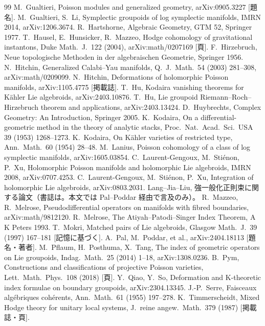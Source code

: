 \begin{thebibliography}{99}
 M.\ Gualtieri, Poisson modules and generalized geometry, arXiv:0905.3227 [題名\tQ].
 M.\ Gualtieri, S.\ Li, Symplectic groupoids of log symplectic manifolds, IMRN 2014, arXiv:1206.3674.
 R.\ Hartshorne, Algebraic Geometry, GTM 52, Springer 1977.
 T.\ Hausel, E.\ Hunsicker, R.\ Mazzeo, Hodge cohomology of gravitational instantons, Duke Math.\ J.\ 122 (2004), arXiv:math/0207169 [頁\tQ].
 F.\ Hirzebruch, Neue topologische Methoden in der algebraischen Geometrie, Springer 1956.
 N.\ Hitchin, Generalized Calabi--Yau manifolds, Q.\ J.\ Math.\ 54 (2003) 281--308, arXiv:math/0209099.
 N.\ Hitchin, Deformations of holomorphic Poisson manifolds, arXiv:1105.4775 [掲載誌\tQ].
 T.\ Hu, Kodaira vanishing theorems for K\"ahler Lie algebroids, arXiv:2403.10876.
 T.\ Hu, Lie groupoid Riemann--Roch--Hirzebruch theorem and applications, arXiv:2403.13424.
 D.\ Huybrechts, Complex Geometry: An Introduction, Springer 2005.
 K.\ Kodaira, On a differential-geometric method in the theory of analytic stacks, Proc.\ Nat.\ Acad.\ Sci.\ USA 39 (1953) 1268--1273.
 K.\ Kodaira, On K\"ahler varieties of restricted type, Ann.\ Math.\ 60 (1954) 28--48.
 M.\ Lanius, Poisson cohomology of a class of log symplectic manifolds, arXiv:1605.03854.
 C.\ Laurent-Gengoux, M.\ Sti\'enon, P.\ Xu, Holomorphic Poisson manifolds and holomorphic Lie algebroids, IMRN 2008, arXiv:0707.4253.
 C.\ Laurent-Gengoux, M.\ Sti\'enon, P.\ Xu, Integration of holomorphic Lie algebroids, arXiv:0803.2031.
 Lang--Jia--Liu, 強一般化正則束に関する論文（書誌は\tQ。本文では Pal--Poddar 経由で言及のみ）。
 R.\ Mazzeo, R.\ Melrose, Pseudodifferential operators on manifolds with fibred boundaries, arXiv:math/9812120.
 R.\ Melrose, The Atiyah--Patodi--Singer Index Theorem, A K Peters 1993.
 T.\ Mokri, Matched pairs of Lie algebroids, Glasgow Math.\ J.\ 39 (1997) 167--181 [記憶に基づく\tQ].
 A.\ Pal, M.\ Poddar, et al., arXiv:2404.18113 [題名・著者\tQ].
 M.\ Pflaum, H.\ Posthuma, X.\ Tang, The index of geometric operators on Lie groupoids, Indag.\ Math.\ 25 (2014) 1--18, arXiv:1308.0236.
 B.\ Pym, Constructions and classifications of projective Poisson varieties, Lett.\ Math.\ Phys.\ 108 (2018) [頁\tQ].
 Y.\ Qiao, Y.\ So, Deformation and K-theoretic index formulae on boundary groupoids, arXiv:2304.13345.
 J.-P.\ Serre, Faisceaux alg\'ebriques coh\'erents, Ann.\ Math.\ 61 (1955) 197--278.
 K.\ Timmerscheidt, Mixed Hodge theory for unitary local systems, J.\ reine angew.\ Math.\ 379 (1987) [掲載誌・頁\tQ].
\end{thebibliography}
